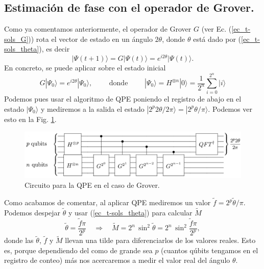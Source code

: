 \documentclass[a4paper,11pt]{book} %
\numberwithin{equation}{chapter}
\def\rqa{\quad \Rightarrow \quad}
\begin{document}
\subsection{Estimación de fase con el operador de Grover.}

Como ya comentamos anteriormente, el operador de Grover $G$ (ver Ec. (\ref{ec_t-sols_G})) rota el vector de estado en un ángulo $2\theta$, donde $\theta$ está dado por (\ref{ec_t-sols_theta}), es decir
\begin{equation}
|\Psi(t+1) \rangle = G | \Psi(t) \rangle = e^{i 2 \theta} | \Psi(t) \rangle.
\end{equation}
En concreto, se puede aplicar sobre el estado inicial
\begin{equation}
\boxed{G | \Psi_0 \rangle = e^{i 2 \theta} | \Psi_0 \rangle}, 
\qquad \text{ donde } \qquad
| \Psi_0 \rangle = H^{\otimes n} |0\rangle = \frac{1}{2^n}  \sum_{i=0}^{2^n} | i \rangle
\end{equation}
Podemos pues usar el algoritmo de QPE poniendo el registro de abajo en el estado $| \Psi_0 \rangle $ y mediremos a la salida el estado $| 2^p 2 \theta / 2 \pi \rangle = | 2^p \theta / \pi \rangle$. Podemos ver esto en la Fig. \ref{Fig_QC_QPE_G}.

	\begin{figure}[h]
	\centering 
	\includegraphics[width=0.9\linewidth]{Figuras/Fig_QC_QPE_G.png}
	\caption{Circuito para la QPE en el caso de Grover.}
	\label{Fig_QC_QPE_G}
	\end{figure}

Como acabamos de comentar, al aplicar QPE mediremos un valor $\tilde{f} = 2^p\tilde{\theta} / \pi$. Podemos despejar $\tilde{\theta}$ y usar (\ref{ec_t-sols_theta}) para calcular $\tilde{M}$
\begin{equation} \label{ec_QC_medidas}
\tilde{\theta} = \frac{\tilde{f} \pi}{2^p} \rqa \tilde{M} = 2^n \, \sin^2 \tilde{\theta} = 2^n \, \sin^2 \frac{\tilde{f} \pi}{2^p},
\end{equation}
donde las $\tilde{\theta}$, $\tilde{f}$ y $\tilde{M}$ llevan una tilde para diferenciarlos de los valores reales. Esto es, porque dependiendo del como de grande sea $p$ (cuantos qúbits tengamos en el registro de conteo) más nos acercaremos a medir el valor real del ángulo $\theta$. 
\end{document}

